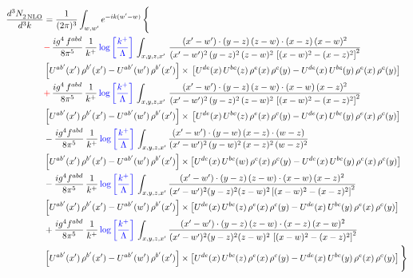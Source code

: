 \documentclass[9pt]{article}
\numberwithin{equation}{section}
\begin{document}
\begin{align}
   \frac{d^{3}N_{2\,\rm NLO}^{\rm}}{d^{3}k}  & = \frac{1}{(2\pi)^{3}}  \int_{w, w^\prime} e^{-ik(w^\prime-w)}\, \Bigg\{\notag \\ &  {\color{red}-\,}\frac{ig^{4}\, f^{abd}}{8\pi^{5}}\, \frac{1}{k^{+}}\,{\color{blue}\log{\left[\frac{k^{+}}{\Lambda}\right]}}\, \int_{x,y,z,x'}\,\frac{(x'-w')\cdot  (y-z)\, (z-w)\cdot (x-z)\, (x-w)^{2}}{(x'-w')^{2}\, (y-z)^{2}\, (z-w)^{2}\,\left[(x-w)^{2}-(x-z)^{2}\right]^{2}}\, \notag \\ & \left[U^{ab'}(x')\,\rho^{b'}(x')-U^{ab'}(w')\, \rho^{b'}(x')\right]\times\,\left[U^{de}(x)\,U^{bc}(z)\, \rho^{e}(x)\,\rho^{c}(y)-U^{de}(x)\,U^{bc}(y)\,\rho^{e}(x)\,\rho^{c}(y)\right]\notag \\ &   {\color{red}+\,} \frac{ig^{4}\, f^{abd}}{8\pi^{5}}\, \frac{1}{k^{+}}\,{\color{blue}\log{\left[\frac{k^{+}}{\Lambda}\right]}}\, \int_{x,y,z,x'}\,\frac{(x'-w')\cdot  (y-z)\, (z-w)\cdot (x-w)\, (x-z)^{2}}{(x'-w')^{2}\, (y-z)^{2}\, (z-w)^{2}\,\left[(x-w)^{2}-(x-z)^{2}\right]^{2}}\, \notag \\ & \left[U^{ab'}(x')\,\rho^{b'}(x')-U^{ab'}(w')\, \rho^{b'}(x')\right]\times\,\left[U^{de}(x)\,U^{bc}(z)\, \rho^{e}(x)\,\rho^{c}(y)-U^{de}(x)\,U^{bc}(y)\,\rho^{e}(x)\,\rho^{c}(y)\right]\notag \\ & -\frac{ig^{4}f^{abd}}{8\pi^{5}}\,\frac{1}{k^{+}}\,{\color{blue}\log{\left[\frac{k^{+}}{\Lambda}\right]}}\,\int_{x,y,z,x'}
\frac{(x'-w')\cdot (y-w)\, (x-z)\cdot (w-z)}{(x'-w')^{2}\, (y-w)^{2}\, (x-z)^{2}\, (w-z)^{2}}\notag \\ & \left[U^{ab'}(x')\,\rho^{b'}(x')-U^{ab'}(w')\, \rho^{b'}(x')\right]\times \left[U^{de}(x)\,U^{bc}(w)\, \rho^{e}(x)\,\rho^{c}(y)-U^{de}(x)\,U^{bc}(y)\,\rho^{e}(x)\,\rho^{c}(y)\right]\notag \\ & -\frac{ig^{4}f^{abd}}{8\pi^{5}}\,\frac{1}{k^{+}}\,{\color{blue}\log{\left[\frac{k^{+}}{\Lambda}\right]}}\,\int_{x,y,z,x'}
\frac{(x'-w')\cdot(y-z)\,(z-w)\cdot(x-w)\,(x-z)^{2}}{(x'-w')^{2}(y-z)^{2}(z-w)^{2}\left[(x-w)^{2}-(x-z)^{2}\right]^{2}}\notag \\ & \left[U^{ab'}(x')\,\rho^{b'}(x')-U^{ab'}(w')\, \rho^{b'}(x')\right]\times \left[U^{de}(x)\,U^{bc}(z)\, \rho^{e}(x)\,\rho^{c}(y)-U^{de}(x)\,U^{bc}(y)\,\rho^{e}(x)\,\rho^{c}(y)\right]\notag \\ & +\frac{ig^{4}f^{abd}}{8\pi^{5}}\,\frac{1}{k^{+}}\,{\color{blue}\log{\left[\frac{k^{+}}{\Lambda}\right]}}\,\int_{x,y,z,x'}
\frac{(x'-w')\cdot(y-z)\,(z-w)\cdot(x-z)\,(x-w)^{2}}{(x'-w')^{2}(y-z)^{2}(z-w)^{2}\,\left[(x-w)^{2}-(x-z)^{2}\right]^{2}}\notag \\ & \left[U^{ab'}(x')\,\rho^{b'}(x')-U^{ab'}(w')\, \rho^{b'}(x')\right]\times \left[U^{de}(x)\,U^{bc}(z)\, \rho^{e}(x)\,\rho^{c}(y)-U^{de}(x)\,U^{bc}(y)\,\rho^{e}(x)\,\rho^{c}(y)\right]\Bigg\} 
\end{align}   
\end{document}
